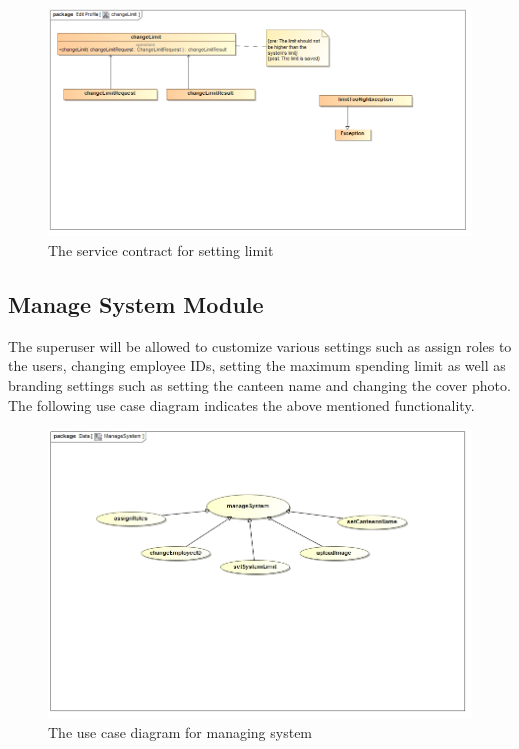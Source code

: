 \documentclass[a4paper,12pt]{article}
\begin{document}
\begin{figure}[H]
	\centering
	\includegraphics[width=1.0\textwidth]{../Diagrams/ManageProfile/serviceContracts/changeLimitServiceContract.png}
	\caption{The service contract for setting limit}
\end{figure}
 
\subsection{Manage System Module}

 The superuser will be allowed to customize various settings such as assign roles to the users, changing employee IDs, setting the maximum spending limit as well as branding settings such as setting the canteen name and changing the cover photo. The following use case diagram indicates the above mentioned functionality.

\begin{figure}[H]
  \centering
    \includegraphics[width=1.0\textwidth]{../images/ManageSystem.jpg}
    \caption{The use case diagram for managing system} 
\end{figure}
\end{document}
